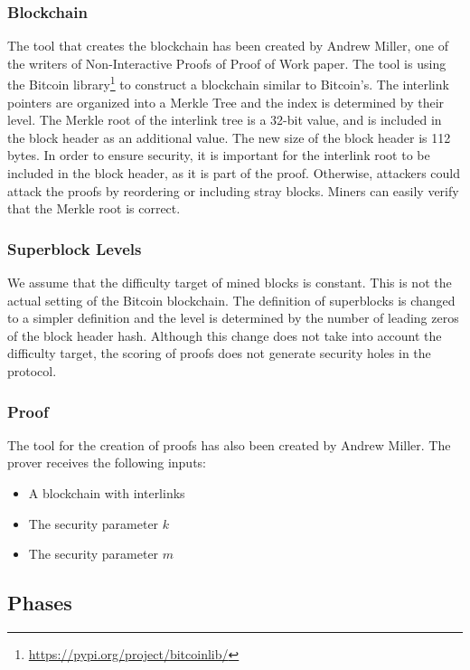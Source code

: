 \subsubsection{Blockchain}

The tool that creates the blockchain has been created by Andrew Miller, one of
the writers of Non-Interactive Proofs of Proof of Work paper. The tool is using
the Bitcoin library\footnote{\url{https://pypi.org/project/bitcoinlib/}} to construct
a blockchain similar to Bitcoin’s. The interlink pointers are organized into a
Merkle Tree and the index is determined by their level. The Merkle root of the
interlink tree is a 32-bit value, and is included in the block header as an
additional value. The new size of the block header is 112 bytes. In order to
ensure security, it is important for the interlink root to be included in the
block header, as it is part of the proof. Otherwise, attackers could attack
the proofs by reordering or including stray blocks. Miners can easily verify
that the Merkle root is correct.

\subsubsection{Superblock Levels}

We assume that the difficulty target of mined blocks is constant. This is not
the actual setting of the Bitcoin blockchain. The definition of superblocks is
changed to a simpler definition and the level is determined by the number of
leading zeros of the block header hash. Although this change does not take into
account the difficulty target, the scoring of proofs does not generate security
holes in the protocol.

\subsubsection{Proof}

The tool for the creation of proofs has also been created by Andrew Miller. The
prover receives the following inputs:

\begin{itemize}
  \item
    A blockchain with interlinks
  \item
    The security parameter $k$
  \item
    The security parameter $m$
\end{itemize}

\subsection{Phases}

